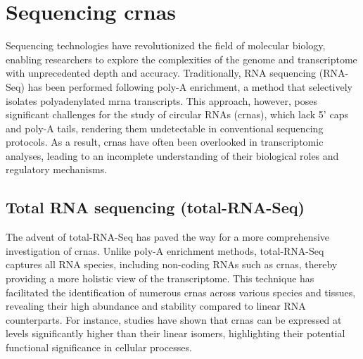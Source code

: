 \section{Sequencing \gls{crna}s}

Sequencing technologies have revolutionized the field of molecular biology,
enabling researchers to explore the complexities of the genome and
transcriptome with unprecedented depth and accuracy.
Traditionally, RNA sequencing (RNA-Seq) has been performed following poly-A
enrichment, a method that selectively isolates polyadenylated \gls{mrna} transcripts.
This approach, however, poses significant challenges for the study of circular
RNAs (\gls{crna}s), which lack 5' caps and poly-A tails, rendering them
undetectable in conventional sequencing protocols\supercite{guo_expanded_2014}.
As a result, \gls{crna}s have often been overlooked in transcriptomic analyses,
leading to an incomplete understanding of their biological roles and regulatory
mechanisms.

\subsection{Total RNA sequencing (total-RNA-Seq)}
The advent of total-RNA-Seq has paved the way for a more comprehensive
investigation of \gls{crna}s.
Unlike poly-A enrichment methods, total-RNA-Seq captures all RNA species,
including non-coding RNAs such as \gls{crna}s, thereby providing a more
holistic view of the transcriptome\supercite{panda_identification_2017}.
This technique has facilitated the identification of numerous \gls{crna}s
across various species and tissues, revealing their high abundance and
stability compared to linear RNA
counterparts\supercite{liu_circular_2016,cao_expression_2018}.
For instance, studies have shown that \gls{crna}s can be expressed at levels
significantly higher than their linear isomers, highlighting their potential
functional significance in cellular processes\supercite{liu_circular_2016}.
